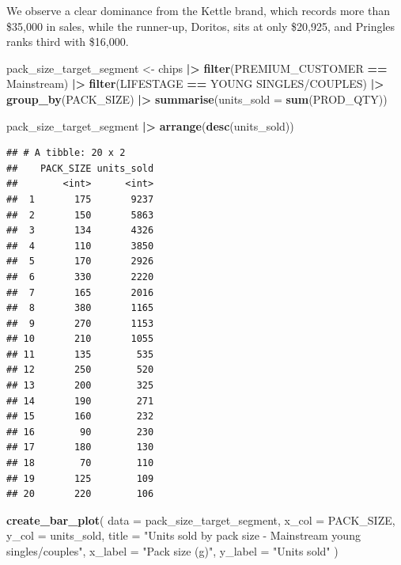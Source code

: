 \documentclass[
]{article}
\newenvironment{Shaded}{\begin{snugshade}}{\end{snugshade}}
\newcommand{\AttributeTok}[1]{\textcolor[rgb]{0.13,0.29,0.53}{#1}}
\newcommand{\FunctionTok}[1]{\textcolor[rgb]{0.13,0.29,0.53}{\textbf{#1}}}
\newcommand{\NormalTok}[1]{#1}
\newcommand{\OtherTok}[1]{\textcolor[rgb]{0.56,0.35,0.01}{#1}}
\newcommand{\SpecialCharTok}[1]{\textcolor[rgb]{0.81,0.36,0.00}{\textbf{#1}}}
\newcommand{\StringTok}[1]{\textcolor[rgb]{0.31,0.60,0.02}{#1}}
\begin{document}
We observe a clear dominance from the Kettle brand, which records more
than \$35,000 in sales, while the runner-up, Doritos, sits at only
\$20,925, and Pringles ranks third with \$16,000.

\begin{Shaded}
\begin{Highlighting}[]
\NormalTok{pack\_size\_target\_segment }\OtherTok{\textless{}{-}}\NormalTok{ chips }\SpecialCharTok{|\textgreater{}} 
  \FunctionTok{filter}\NormalTok{(PREMIUM\_CUSTOMER }\SpecialCharTok{==} \StringTok{\textquotesingle{}Mainstream\textquotesingle{}}\NormalTok{) }\SpecialCharTok{|\textgreater{}} 
  \FunctionTok{filter}\NormalTok{(LIFESTAGE }\SpecialCharTok{==} \StringTok{\textquotesingle{}YOUNG SINGLES/COUPLES\textquotesingle{}}\NormalTok{) }\SpecialCharTok{|\textgreater{}} 
  \FunctionTok{group\_by}\NormalTok{(PACK\_SIZE) }\SpecialCharTok{|\textgreater{}} 
  \FunctionTok{summarise}\NormalTok{(}\AttributeTok{units\_sold =} \FunctionTok{sum}\NormalTok{(PROD\_QTY))}

\NormalTok{pack\_size\_target\_segment }\SpecialCharTok{|\textgreater{}} 
  \FunctionTok{arrange}\NormalTok{(}\FunctionTok{desc}\NormalTok{(units\_sold))}
\end{Highlighting}
\end{Shaded}

\begin{verbatim}
## # A tibble: 20 x 2
##    PACK_SIZE units_sold
##        <int>      <int>
##  1       175       9237
##  2       150       5863
##  3       134       4326
##  4       110       3850
##  5       170       2926
##  6       330       2220
##  7       165       2016
##  8       380       1165
##  9       270       1153
## 10       210       1055
## 11       135        535
## 12       250        520
## 13       200        325
## 14       190        271
## 15       160        232
## 16        90        230
## 17       180        130
## 18        70        110
## 19       125        109
## 20       220        106
\end{verbatim}

\begin{Shaded}
\begin{Highlighting}[]
\FunctionTok{create\_bar\_plot}\NormalTok{(}
  \AttributeTok{data =}\NormalTok{ pack\_size\_target\_segment,}
  \AttributeTok{x\_col =}\NormalTok{ PACK\_SIZE,}
  \AttributeTok{y\_col =}\NormalTok{ units\_sold,}
  \AttributeTok{title =} \StringTok{"Units sold by pack size {-} Mainstream young singles/couples"}\NormalTok{,}
  \AttributeTok{x\_label =} \StringTok{"Pack size (g)"}\NormalTok{,}
  \AttributeTok{y\_label =} \StringTok{"Units sold"}
\NormalTok{)}
\end{Highlighting}
\end{Shaded}
\end{document}
